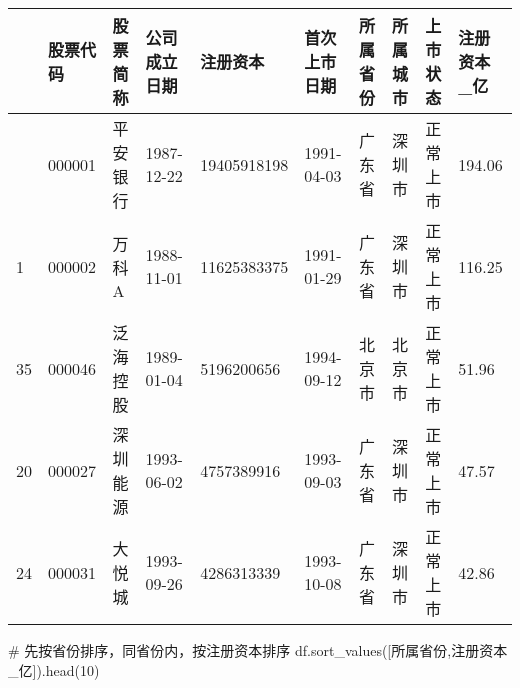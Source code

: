 \documentclass[
  letterpaper,
  DIV=11,
  numbers=noendperiod]{scrreprt}
\newenvironment{Shaded}{\begin{snugshade}}{\end{snugshade}}
\newcommand{\CommentTok}[1]{\textcolor[rgb]{0.37,0.37,0.37}{#1}}
\newcommand{\DecValTok}[1]{\textcolor[rgb]{0.68,0.00,0.00}{#1}}
\newcommand{\NormalTok}[1]{\textcolor[rgb]{0.00,0.23,0.31}{#1}}
\newcommand{\StringTok}[1]{\textcolor[rgb]{0.13,0.47,0.30}{#1}}
\begin{document}
\begin{longtable}[]{@{}llllllllll@{}}
\toprule\noalign{}
& 股票代码 & 股票简称 & 公司成立日期 & 注册资本 & 首次上市日期 &
所属省份 & 所属城市 & 上市状态 & 注册资本\_亿 \\
\midrule\noalign{}
\endhead
\bottomrule\noalign{}
\endlastfoot
0 & 000001 & 平安银行 & 1987-12-22 & 19405918198 & 1991-04-03 & 广东省 &
深圳市 & 正常上市 & 194.06 \\
1 & 000002 & 万科A & 1988-11-01 & 11625383375 & 1991-01-29 & 广东省 &
深圳市 & 正常上市 & 116.25 \\
35 & 000046 & 泛海控股 & 1989-01-04 & 5196200656 & 1994-09-12 & 北京市 &
北京市 & 正常上市 & 51.96 \\
20 & 000027 & 深圳能源 & 1993-06-02 & 4757389916 & 1993-09-03 & 广东省 &
深圳市 & 正常上市 & 47.57 \\
24 & 000031 & 大悦城 & 1993-09-26 & 4286313339 & 1993-10-08 & 广东省 &
深圳市 & 正常上市 & 42.86 \\
\end{longtable}

\begin{Shaded}
\begin{Highlighting}[]
\CommentTok{\# 先按省份排序，同省份内，按注册资本排序}
\NormalTok{df.sort\_values([}\StringTok{\textquotesingle{}所属省份\textquotesingle{}}\NormalTok{,}\StringTok{\textquotesingle{}注册资本\_亿\textquotesingle{}}\NormalTok{]).head(}\DecValTok{10}\NormalTok{)}
\end{Highlighting}
\end{Shaded}
\end{document}
